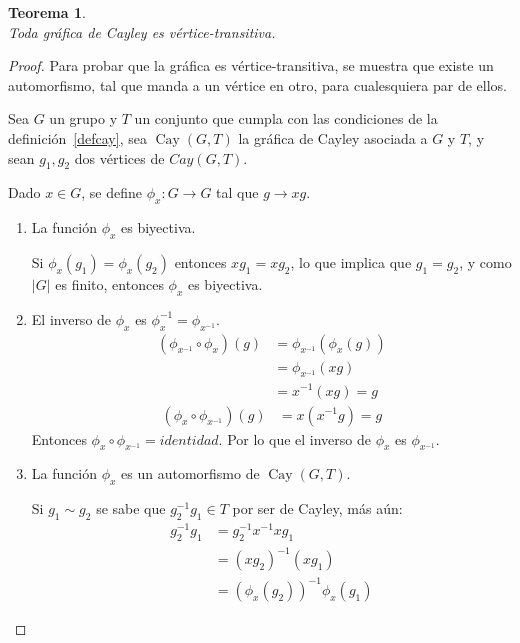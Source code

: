 \documentclass[12pt]{book}
\newtheorem{theorem}{Teorema}
\theoremstyle{definition}
\DeclareMathOperator{\Cay}{Cay}
\begin{document}
\begin{theorem}\textbf{}\\
  Toda gráfica de Cayley es vértice-transitiva.
  \label{CayVT}
\end{theorem}

\begin{proof}
 Para probar que la gráfica es vértice-transitiva, se
muestra que existe un automorfismo, tal que manda a un vértice en
otro, para cualesquiera par de ellos.

Sea $G$ un grupo y $T$ un conjunto que cumpla con las condiciones de
la definición~\ref{defcay}, sea $\Cay(G,T)$  la gráfica de Cayley
asociada a $G$ y $T$, y sean $g_1, g_2$ dos vértices
de $Cay(G,T)$. 

Dado $x \in G$, se define $\phi_x:G \rightarrow G$ tal que $g
\rightarrow xg$.

\begin{enumerate}

\item \label{1}
La función $\phi_x$ es biyectiva.

Si $\phi_x(g_1)=\phi_x(g_2)$ entonces
$xg_1=xg_2$, lo que implica que $g_1=g_2$, y como $|G|$ es finito,
entonces $\phi_x$ es biyectiva.      

\item\label{2}
El inverso de $\phi_x$ es $\phi_x^{-1}=\phi_{x^{-1}}$.
\begin{equation*}
  \begin{split}
    (\phi_{x^{-1}}\circ \phi_x)(g)&= \phi_{x^{-1}} (\phi_x(g))\\
    &=\phi_{x^{-1}}(xg)\\
    &=x^{-1}(xg)=g
  \end{split}
\end{equation*}
\begin{equation*}
  \begin{split}
    (\phi_x \circ \phi_{x^{-1}})(g)&=x(x^{-1}g)=g
  \end{split}
\end{equation*}
Entonces $\phi_x \circ \phi_{x^{-1}}=identidad$. Por lo que el inverso
de $\phi_x$ es $\phi_{x^{-1}}$.

\item \label{3}
La función $\phi_x$ es un automorfismo de $\Cay(G,T)$. 

Si $g_1 \sim g_2$ se sabe que $g_2^{-1}g_1\in T$ por ser de Cayley, más aún:
\begin{equation*}
  \begin{split}
    g_2^{-1}g_1&=g_2^{-1}x^{-1}xg_1\\
    &=(xg_2)^{-1}(xg_1)\\
    &=(\phi_x(g_2))^{-1} \phi_x(g_1)
  \end{split}
\end{equation*}


\end{enumerate}
\end{proof}
\end{document}
